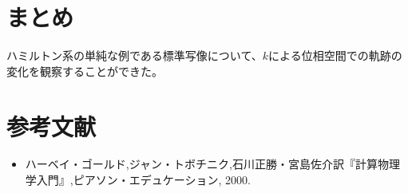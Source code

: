 \documentclass{jsarticle}
\begin{document}
    \section{まとめ}
        ハミルトン系の単純な例である標準写像について、$k$による位相空間での軌跡の変化を観察することができた。
    \section{参考文献}
        \begin{itemize}
            \item ハーベイ・ゴールド,ジャン・トボチニク,石川正勝・宮島佐介訳『計算物理学入門』,ピアソン・エデュケーション, 2000.
        \end{itemize}
\end{document}
